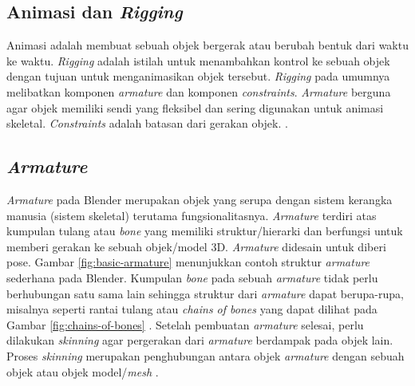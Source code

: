 \subsection{Animasi dan \textit{Rigging}}
Animasi adalah membuat sebuah objek
bergerak atau berubah bentuk dari waktu ke waktu. \textit{Rigging} adalah
istilah untuk menambahkan kontrol ke sebuah objek dengan tujuan untuk
menganimasikan objek tersebut. \textit{Rigging} pada umumnya melibatkan komponen
\textit{armature} dan komponen \textit{constraints}. \textit{Armature} berguna
agar objek memiliki sendi yang fleksibel dan sering digunakan untuk animasi
skeletal. \textit{Constraints} adalah batasan dari gerakan objek.
\parencite{blender-animation-and-rigging}.

\subsection{\textit{Armature}}

\textit{Armature} pada Blender merupakan objek yang serupa dengan sistem
kerangka manusia (sistem skeletal) terutama fungsionalitasnya. \textit{Armature}
terdiri atas kumpulan tulang atau \textit{bone} yang memiliki struktur/hierarki
dan berfungsi untuk memberi gerakan ke sebuah objek/model 3D. \textit{Armature}
didesain untuk diberi pose. Gambar \ref{fig:basic-armature} menunjukkan contoh
struktur \textit{armature} sederhana pada Blender. Kumpulan \textit{bone} pada
sebuah \textit{armature} tidak perlu berhubungan satu sama lain sehingga
struktur dari \textit{armature} dapat berupa-rupa, misalnya seperti rantai
tulang atau \textit{chains of bones} yang dapat dilihat pada Gambar
\ref{fig:chains-of-bones} \parencite{blender-armature-introduction,
blender-armature-structure}. Setelah pembuatan \textit{armature} selesai, perlu
dilakukan \textit{skinning} agar pergerakan dari \textit{armature} berdampak
pada objek lain. Proses \textit{skinning} merupakan penghubungan antara objek
\textit{armature} dengan sebuah objek atau objek model/\textit{mesh}
\parencite{blender-skinning-introduction}.


